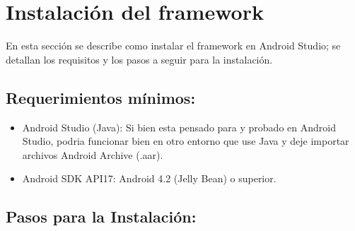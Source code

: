 \section{Instalación del framework}
En esta sección se describe como instalar el framework en Android Studio; se detallan los requisitos y los pasos a seguir para la instalación.

\subsection{Requerimientos mínimos:}

\begin{itemize}
\item Android Studio (Java): Si bien esta pensado para y probado en Android Studio, podria funcionar bien en otro entorno que use Java y deje importar archivos Android Archive (.aar).
\item Android SDK API17: Android 4.2 (Jelly Bean) o superior.
\end{itemize}

\subsection{Pasos para la Instalación:}


